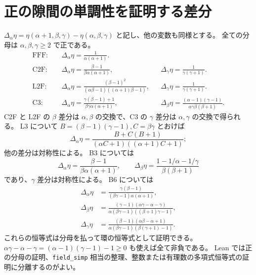 \documentclass[11pt,a4paper]{ltjsarticle}
\numberwithin{equation}{section}
\theoremstyle{definition}
\begin{document}
\section{正の隙間の単調性を証明する差分}\label{app:diff}
$\Delta_\alpha\eta=\eta(\alpha+1,\beta,\gamma)-\eta(\alpha,\beta,\gamma)$ と記し、他の変数も同様とする。
全ての分母は $\alpha,\beta,\gamma\ge2$ で正である。
\begin{align*}
\mathrm{FFF}:\quad &\Delta_\alpha\eta=\frac1{\alpha(\alpha+1)}.\\
\mathrm{C2F}:\quad &\Delta_\alpha\eta=\frac{\beta-1}{\beta\alpha(\alpha+1)},
 &&\Delta_\gamma\eta=\frac1{\gamma(\gamma+1)}.\\
\mathrm{L2F}:\quad &\Delta_\alpha\eta=
 \frac{(\beta-1)^2}{(\alpha\beta-1)((\alpha+1)\beta-1)},
 &&\Delta_\gamma\eta=\frac1{\gamma(\gamma+1)}.\\
\mathrm{C3}:\quad &\Delta_\alpha\eta=
 \frac{\gamma(\beta-1)+1}{\beta\gamma\alpha(\alpha+1)},
 &&\Delta_\beta\eta=
 \frac{(\alpha-1)(\gamma-1)}{\alpha\gamma\beta(\beta+1)}.
\end{align*}
C2F と L2F の $\beta$ 差分は $\alpha,\beta$ の交換で、C3 の $\gamma$ 差分は $\alpha,\gamma$ の交換で得られる。
L3 について $B=(\beta-1)(\gamma-1), C=\beta\gamma$ とおけば
\[
 \Delta_\alpha\eta=\frac{B+C(B+1)}{(\alpha C+1)((\alpha+1)C+1)};
\]
他の差分は対称性による。
B3 については
\[
 \Delta_\alpha\eta=\frac{\beta-1}{\beta\alpha(\alpha+1)},\qquad
 \Delta_\beta\eta=\frac{1-1/\alpha-1/\gamma}{\beta(\beta+1)}
\]
であり、$\gamma$ 差分は対称性による。
B6 については
\begin{align*}
 \Delta_\alpha\eta&=\frac{\gamma(\beta-1)}{(\beta\gamma-1)\alpha(\alpha+1)},\\
 \Delta_\beta\eta&=\frac{(\gamma-1)(\alpha\gamma-\alpha-\gamma)}
 {\alpha(\beta\gamma-1)((\beta+1)\gamma-1)},\\
 \Delta_\gamma\eta&=\frac{(\beta-1)(\alpha\beta-\alpha+1)}
 {\alpha(\beta\gamma-1)(\beta(\gamma+1)-1)}.
\end{align*}
これらの恒等式は分母を払って環の恒等式として証明できる。
$\alpha\gamma-\alpha-\gamma=(\alpha-1)(\gamma-1)-1\ge0$ も使えば全て非負である。
Lean では正の分母の証明、\texttt{field\_simp} 相当の整理、整数または有理数の多項式恒等式の証明に分離するのがよい。
\end{document}
